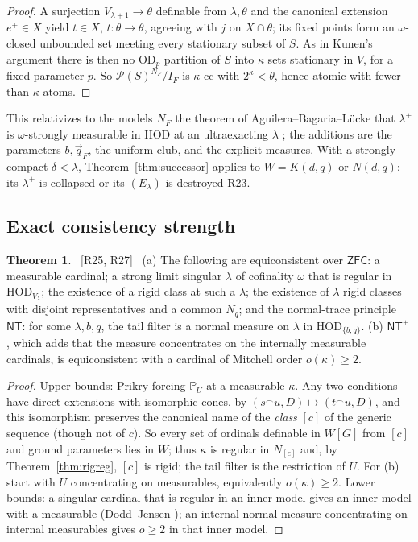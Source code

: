\documentclass[11pt,letterpaper]{article}
\theoremstyle{definition}
\newtheorem{theorem}[definition]{Theorem}
\numberwithin{equation}{section}
\newcommand{\ZFC}{\mathsf{ZFC}}
\newcommand{\HOD}{\mathrm{HOD}}
\newcommand{\OD}{\mathrm{OD}}
\newcommand{\Pow}{\mathcal P}
\newcommand{\PP}{\mathbb P}
\newcommand{\src}[1]{\unskip\ {\normalfont\small\sffamily\color{Olive}[#1]}\ }
\newcommand{\R}[1]{\textsf{R#1}}
\begin{document}
\begin{proof}
A surjection $V_{\lambda+1}\to\theta$ definable from $\lambda,\theta$ and the canonical extension $e^+\in X$ yield $t\in X$, $t:\theta\to\theta$, agreeing with $j$ on $X\cap\theta$; its fixed points form an $\omega$-closed unbounded set meeting every stationary subset of $S$. As in Kunen's argument there is then no $\OD_p$ partition of $S$ into $\kappa$ sets stationary in $V$, for a fixed parameter $p$. So $\Pow(S)^{N_F}/I_F$ is $\kappa$-cc with $2^\kappa<\theta$, hence atomic with fewer than $\kappa$ atoms.
\end{proof}

This relativizes to the models $N_F$ the theorem of Aguilera--Bagaria--L\"ucke that $\lambda^+$ is $\omega$-strongly measurable in $\HOD$ at an ultraexacting $\lambda$ \cite[Cor.~3.15]{abl}; the additions are the parameters $b,\vec q_F$, the uniform club, and the explicit measures. With a strongly compact $\delta<\lambda$, Theorem~\ref{thm:successor} applies to $W=K(d,q)$ or $N(d,q)$: its $\lambda^+$ is collapsed or its $(E_\lambda)$ is destroyed \R{23}.

\subsection{Exact consistency strength}

\begin{theorem}\label{thm:strength}\src{R25, R27}
(a) The following are equiconsistent over $\ZFC$: a measurable cardinal; a strong limit singular $\lambda$ of cofinality $\omega$ that is regular in $\HOD_{V_\lambda}$; the existence of a rigid class at such a $\lambda$; the existence of $\lambda$ rigid classes with disjoint representatives and a common $N_q$; and the normal-trace principle $\mathsf{NT}$: for some $\lambda,b,q$, the tail filter is a normal measure on $\lambda$ in $\HOD_{\{b,q\}}$.
(b) $\mathsf{NT}^+$, which adds that the measure concentrates on the internally measurable cardinals, is equiconsistent with a cardinal of Mitchell order $o(\kappa)\ge2$.
\end{theorem}

\begin{proof}
Upper bounds: Prikry forcing $\PP_U$ at a measurable $\kappa$. Any two conditions have direct extensions with isomorphic cones, by $(s^\frown u,D)\mapsto(t^\frown u,D)$, and this isomorphism preserves the canonical name of the \emph{class} $[c]$ of the generic sequence (though not of $c$). So every set of ordinals definable in $W[G]$ from $[c]$ and ground parameters lies in $W$; thus $\kappa$ is regular in $N_{[c]}$ and, by Theorem~\ref{thm:rigreg}, $[c]$ is rigid; the tail filter is the restriction of $U$. For (b) start with $U$ concentrating on measurables, equivalently $o(\kappa)\ge2$. Lower bounds: a singular cardinal that is regular in an inner model gives an inner model with a measurable (Dodd--Jensen \cite{dj}); an internal normal measure concentrating on internal measurables gives $o\ge2$ in that inner model.
\end{proof}
\end{document}
